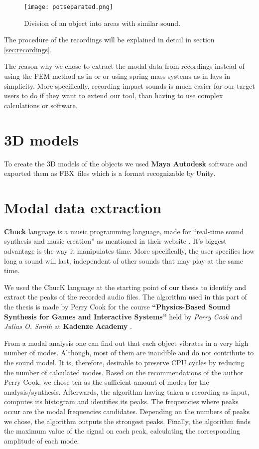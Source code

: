\begin{figure}[H]
  \centering
    \texttt{[image: potseparated.png]}
      \caption{Division of an object into areas with similar sound.}
      \label{fig:pot_sep}
\end{figure} 

The procedure of the recordings will be explained in detail in section \ref{sec:recordings}.

The reason why we chose to extract the modal data from recordings instead of using the FEM method as in \cite{director2001synthesizing} or \cite{o2002synthesizing} or using spring-mass systems as in \cite{raghuvanshi2006interactive} lays in simplicity. More specifically, recording impact sounds is much easier for our target users to do if they want to extend our tool, than having to use complex calculations or software.

\section{3D models}
To create the 3D models of the objects we used \textbf{Maya Autodesk} software \cite{bib:maya} and exported them as FBX\textsuperscript\textregistered\ files \cite{bib:fbx} which is a format recognizable by Unity\textsuperscript{\textregistered}.

\section{Modal data extraction}\label{sec:chuck}
\textbf{Chuck} language is a music programming language, made for ``real-time sound synthesis and music creation'' as mentioned in their website \cite{bib:chuck}. It's biggest advantage is the way it manipulates time. More specifically, the user specifies how long a sound will last, independent of other sounds that may play at the same time.

We used the ChucK language at the starting point of our thesis to identify and extract the peaks of the recorded audio files. The algorithm used in this part of the thesis is made by Perry Cook for the course \textbf{``Physics-Based Sound Synthesis for Games and Interactive Systems''} held by \textit{Perry Cook} and \textit{Julius O. Smith} at \textbf{Kadenze Academy} \cite{bib:physicsbasedcourse}.

From a modal analysis one can find out that each object vibrates in a very high number of modes. Although, most of them are inaudible and do not contribute to the sound model. It is, therefore, desirable to preserve CPU cycles by reducing the number of calculated modes. Based on the recommendations of the author Perry Cook, we chose ten as the sufficient amount of modes for the analysis/synthesis.  Afterwards, the algorithm having taken a recording as input, computes its histogram and identifies its peaks. The frequencies where peaks occur are the modal frequencies candidates. Depending on the numbers of peaks we chose, the algorithm outputs the strongest peaks. Finally, the algorithm finds the maximum value of the signal on each peak, calculating the corresponding amplitude of each mode.

